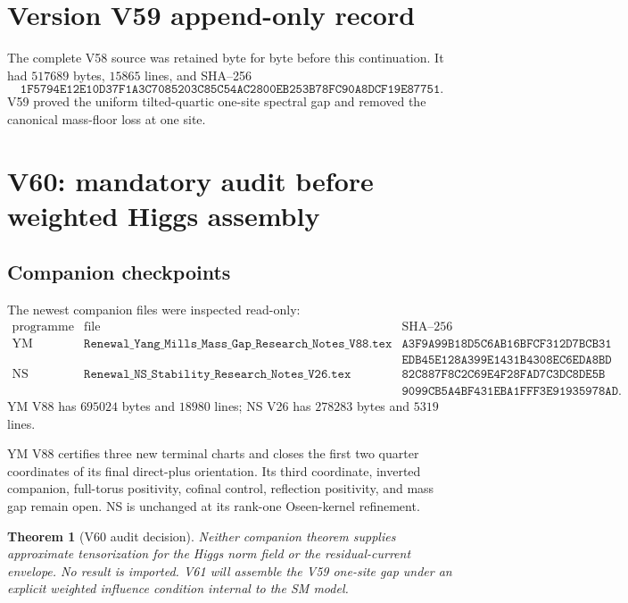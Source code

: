 \documentclass[11pt]{article}
\newtheorem{theorem}{Theorem}[section]
\theoremstyle{remark}
\begin{document}
\section*{Version V59 append-only record}
The complete V58 source was retained byte for byte before this
continuation.  It had \(517689\) bytes, \(15865\) lines, and SHA--256
\[
 \texttt{1F5794E12E10D37F1A3C7085203C85C54AC2800EB253B78FC90A8DCF19E87751}.
\]
V59 proved the uniform tilted-quartic one-site spectral gap and
removed the canonical mass-floor loss at one site.


\section{V60: mandatory audit before weighted Higgs assembly}
\label{sec:v17v60}

\subsection{Companion checkpoints}

The newest companion files were inspected read-only:
\[
\begin{array}{lll}
\text{programme}&\text{file}&\text{SHA--256}\\
\text{YM}&
\texttt{Renewal\_Yang\_Mills\_Mass\_Gap\_Research\_Notes\_V88.tex}&
\texttt{A3F9A99B18D5C6AB16BFCF312D7BCB31}\\
&&\texttt{EDB45E128A399E1431B4308EC6EDA8BD}\\
\text{NS}&
\texttt{Renewal\_NS\_Stability\_Research\_Notes\_V26.tex}&
\texttt{82C887F8C2C69E4F28FAD7C3DC8DE5B}\\
&&\texttt{9099CB5A4BF431EBA1FFF3E91935978AD}.
\end{array}                                        \tag{60.1}
\]
YM V88 has \(695024\) bytes and \(18980\) lines; NS V26 has
\(278283\) bytes and \(5319\) lines.

YM V88 certifies three new terminal charts and closes the first two
quarter coordinates of its final direct-plus orientation.  Its third
coordinate, inverted companion, full-torus positivity, cofinal
control, reflection positivity, and mass gap remain open.  NS is
unchanged at its rank-one Oseen-kernel refinement.

\begin{theorem}[V60 audit decision]
\label{thm:v17v60-decision}
Neither companion theorem supplies approximate tensorization for the
Higgs norm field or the residual-current envelope.  No result is
imported.  V61 will assemble the V59 one-site gap under an explicit
weighted influence condition internal to the SM model.
\end{theorem}
\end{document}
